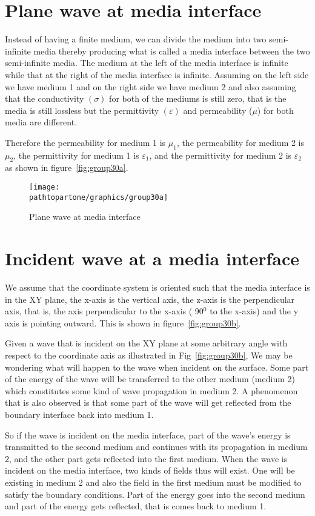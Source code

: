 \section{Plane wave at media interface}

Instead of having a finite medium, we can divide the medium into two semi-infinite media thereby producing what is called a media interface between the two semi-infinite media. The medium at the left of the media interface is infinite while that at the right of the media interface is infinite. Assuming on the left side we have medium 1 and on the right side we have medium 2 and also assuming that the conductivity $(\sigma)$ for both of the mediums is still zero, that is the media is still lossless but the permittivity $(\varepsilon)$ and permeability ($\mu$) for both media are different.

Therefore the permeability for medium 1 is $\mu_1$, the permeability for medium 2 is $\mu_2$, the permittivity for medium 1 is $\varepsilon_1$, and the permittivity for medium 2 is $\varepsilon_2$ as shown in figure~\ref{fig:group30a}.

\begin{figure}[h]
\centering
\texttt{[image: \\pathtopartone/graphics/group30a]}
\caption{Plane wave at media interface}
\label{fig:group30}
\end{figure}

\section{Incident wave at a media interface}
We assume that the coordinate system is oriented such that the media interface is in the XY plane, the x-axis is the vertical axis, the z-axis is the perpendicular axis, that is, the axis perpendicular to the x-axis ( 90$^{0}$ to the x-axis) and the y axis is pointing outward. This is shown in figure~\ref{fig:group30b}.

Given a wave that is incident on the XY plane at some arbitrary angle with respect to the coordinate axis as illustrated in Fig~\ref{fig:group30b}, We may be wondering what will happen to the wave when incident on the surface. Some part of the energy of the wave will be transferred to the other medium (medium 2) which constitutes some kind of wave propagation in medium 2. A phenomenon that is also observed is that some part of the wave will get reflected from the boundary interface back into medium 1.

So if the wave is incident on the media interface, part of the wave's energy is transmitted to the second medium and continues with its propagation in medium 2, and the other part gets reflected into the first medium. When the wave is incident on the media interface, two kinds of fields thus will exist. One will be existing in medium 2 and also the field in the first medium must be modified to satisfy the boundary conditions. Part of the energy goes into the second medium and part of the energy gets reflected, that is comes back to medium 1.

